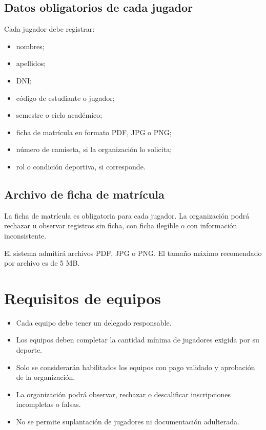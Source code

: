\documentclass[12pt,a4paper]{article}
\begin{document}
\subsection{Datos obligatorios de cada jugador}

Cada jugador debe registrar:

\begin{itemize}
  \item nombres;
  \item apellidos;
  \item DNI;
  \item código de estudiante o jugador;
  \item semestre o ciclo académico;
  \item ficha de matrícula en formato PDF, JPG o PNG;
  \item número de camiseta, si la organización lo solicita;
  \item rol o condición deportiva, si corresponde.
\end{itemize}

\subsection{Archivo de ficha de matrícula}

La ficha de matrícula es obligatoria para cada jugador. La organización podrá rechazar u observar registros sin ficha, con ficha ilegible o con información inconsistente.

El sistema admitirá archivos PDF, JPG o PNG. El tamaño máximo recomendado por archivo es de 5 MB.

\section{Requisitos de equipos}

\begin{itemize}
  \item Cada equipo debe tener un delegado responsable.
  \item Los equipos deben completar la cantidad mínima de jugadores exigida por su deporte.
  \item Solo se considerarán habilitados los equipos con pago validado y aprobación de la organización.
  \item La organización podrá observar, rechazar o descalificar inscripciones incompletas o falsas.
  \item No se permite suplantación de jugadores ni documentación adulterada.
\end{itemize}
\end{document}
